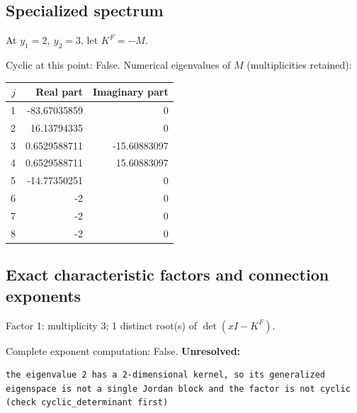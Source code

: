 \documentclass[10pt,a4paper]{article}
\newcommand{\fitmath}[1]{\sbox{\mathbox}{$\displaystyle #1$}\ifdim\wd\mathbox>\linewidth\resizebox{\linewidth}{!}{\usebox{\mathbox}}\else\usebox{\mathbox}\fi}
\begin{document}
\subsection*{Specialized spectrum}
At $y_1=2,\ y_2=3$, let $K^F=-M$.
\begin{center}\fitmath{\Delta=0}\end{center}
Cyclic at this point: False.
Numerical eigenvalues of $M$ (multiplicities retained):
\begin{center}\small\begin{tabular}{rrr}\toprule $j$ & Real part & Imaginary part\\\midrule
1 & -83.67035859 & 0\\
2 & 16.13794335 & 0\\
3 & 0.6529588711 & -15.60883097\\
4 & 0.6529588711 & 15.60883097\\
5 & -14.77350251 & 0\\
6 & -2 & 0\\
7 & -2 & 0\\
8 & -2 & 0\\
\bottomrule\end{tabular}\end{center}
\subsection*{Exact characteristic factors and connection exponents}
Factor 1: multiplicity 3; 1 distinct root(s) of $\det(xI-K^F)$.
\begin{center}\fitmath{\begin{aligned}p_{1}(x)&=x - 2\end{aligned}}\end{center}
Complete exponent computation: False.
\textbf{Unresolved:}

\begin{lstlisting}
the eigenvalue 2 has a 2-dimensional kernel, so its generalized eigenspace is not a single Jordan block and the factor is not cyclic (check cyclic_determinant first)
\end{lstlisting}
\end{document}
